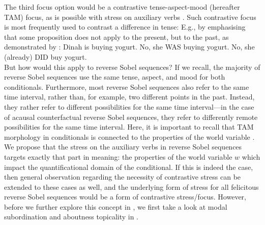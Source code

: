 The third focus option would be a contrastive tense-aspect-mood (hereafter TAM) focus, as is possible with stress on auxiliary verbs \parencite[p.~12f, footnote~3]{Goodhue2018}. Such contrastive focus is most frequently used to contrast a difference in tense: E.g., by emphasising that some proposition does not apply to the present, but to the past, as demonstrated by :
\pex{}
{} Dinah is buying yogurt.
\a{} {} No, she \MakeUppercase{was} buying yogurt.
\a{} {} No, she (already) \MakeUppercase{did} buy yogurt.\\\emptyfill\parencite[p.~13, footnote~3]{Goodhue2018}
\xe
But how would this apply to reverse Sobel sequences? If we recall, the majority of reverse Sobel sequences use the same tense, aspect, and mood for both conditionals. Furthermore, most reverse Sobel sequences also refer to the same time interval, rather than, for example, two different points in the past. Instead, they rather refer to different possibilities for the same time interval---in the case of acausal counterfactual reverse Sobel sequences,  they refer to differently remote possibilities for the same time interval. Here, it is important to recall that TAM morphology in conditionals is connected to the properties of the world variable \parencites{Palmer1986}{Iatridou2000}{Arregui2009}{Romero2014}[amongst others]{Schulz2014}. We propose that the stress on the auxiliary verbs in reverse Sobel sequences targets exactly that part in meaning: the properties of the world variable $w$ which impact the quantificational domain of the conditional. If this is indeed the case, then  general observation regarding the necessity of contrastive stress can be extended to these cases as well, and the underlying form of stress for all felicitous reverse Sobel sequences would be a form of contrastive stress/focus. However, before we further explore this concept in , we first take a look at modal subordination and aboutness topicality in .

